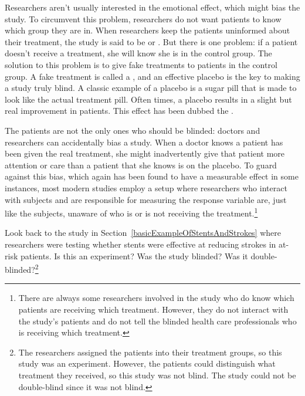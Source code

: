 Researchers aren't usually interested in the emotional effect, which might bias the study. To circumvent this problem, researchers do not want patients to know which group they are in. When researchers keep the patients uninformed about their treatment, the study is said to be  or . But there is one problem: if a patient doesn't receive a treatment, she will know she is in the control group. The solution to this problem is to give fake treatments to patients in the control group. A fake treatment is called a , and an effective placebo is the key to making a study truly blind. A classic example of a placebo is a sugar pill that is made to look like the actual treatment pill. Often times, a placebo results in a slight but real improvement in patients. This effect has been dubbed the .

The patients are not the only ones who should be blinded: doctors and researchers can accidentally bias a study. When a doctor knows a patient has been given the real treatment, she might inadvertently give that patient more attention or care than a patient that she knows is on the placebo. To guard against this bias, which again has been found to have a measurable effect in some instances, most modern studies employ a  setup where researchers who interact with subjects and are responsible for measuring the response variable are, just like the subjects, unaware of who is or is not receiving the treatment.\footnote{There are always some researchers involved in the study who do know which patients are receiving which treatment. However, they do not interact with the study's patients and do not tell the blinded health care professionals who is receiving which treatment.} 


\begin{exercise}
Look back to the study in Section~\ref{basicExampleOfStentsAndStrokes} where researchers were testing whether stents were effective at reducing strokes in at-risk patients. Is this an experiment? Was the study blinded? Was it double-blinded?\footnote{The researchers assigned the patients into their treatment groups, so this study was an experiment. However, the patients could distinguish what treatment they received, so this study was not blind. The study could not be double-blind since it was not blind.}
\end{exercise}



